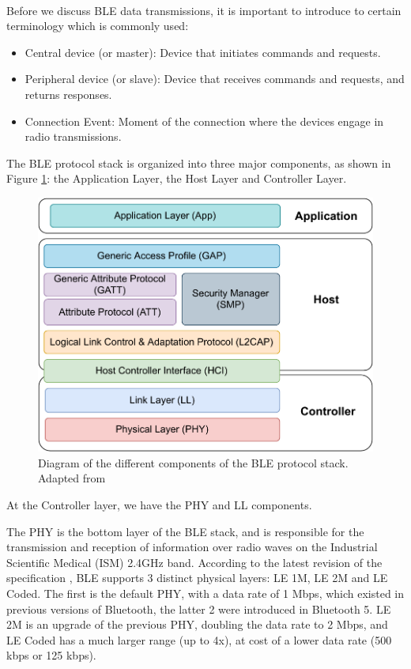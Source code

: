 
\paragraph{} Before we discuss \acs{BLE} data transmissions, it is important to introduce to certain terminology which is commonly used:

\begin{itemize}
    \item Central device (or master): Device that initiates commands and requests.
    \item Peripheral device (or slave): Device that receives commands and requests, and returns responses.
    \item Connection Event: Moment of the connection where the devices engage in radio transmissions.
\end{itemize}

The \acs{BLE} protocol stack is organized into three major components, as shown in Figure \ref{fig:ble-protocol-stack}: the Application Layer, the Host Layer and Controller Layer. 

\begin{figure}[H]
    \centering
    \includegraphics[width=0.6\linewidth]{images/ble protocol stack.pdf}
    \caption[Diagram of the different components of the \acs{BLE} protocol stack.]{Diagram of the different components of the \acs{BLE} protocol stack. Adapted from \cite{Specification1999, Farej2020}}
    \label{fig:ble-protocol-stack}
\end{figure}

At the Controller layer, we have the \acf{PHY} and \acf{LL} components. 

The \acf{PHY} is the bottom layer of the \acs{BLE} stack, and is responsible for the transmission and reception of information over radio waves on the Industrial Scientific Medical (ISM) 2.4GHz band. According to the latest revision of the specification \cite{Specification1999}, \acs{BLE} supports 3 distinct physical layers: LE 1M, LE 2M and LE Coded. The first is the default \acs{PHY}, with a data rate of 1 Mbps, which existed in previous versions of Bluetooth, the latter 2 were introduced in Bluetooth 5. LE 2M is an upgrade of the previous \acs{PHY}, doubling the data rate to 2 Mbps, and LE Coded has a much larger range (up to 4x), at cost of a lower data rate (500 kbps or 125 kbps). 

